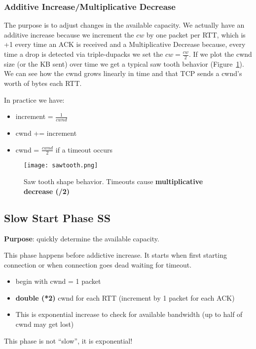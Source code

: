 \subsubsection{Additive Increase/Multiplicative Decrease}

The purpose is to adjust changes in the available capacity.
We actually have an additive increase because we increment the $cw$ by one
packet per RTT, which is +1 every time an ACK is received and a Multiplicative
Decrease because, every time a drop is detected via triple-dupacks we set the
$cw=\frac{cw}{2}$. If we plot the cwnd size (or the KB sent) over time we get a
typical saw tooth behavior (Figure~\ref{fig:tcp:sawtooth}). We can see how the
cwnd grows linearly in time and that TCP sends a cwnd's worth of bytes each RTT.

In practice we have:
\begin{itemize}
  \item increment = $\frac{1}{cwnd}$
  \item cwnd += increment
  \item cwnd = $\frac{cwnd}{2}$ if a timeout occurs
\end{itemize}

\begin{figure}[t]
\texttt{[image: sawtooth.png]}
\caption[Saw tooth shape behavior]{Saw tooth shape behavior. Timeouts cause
  \textbf{multiplicative decrease (/2)}}
\label{fig:tcp:sawtooth}
\end{figure}

\subsection{Slow Start Phase SS}

\textbf{Purpose}: quickly determine the available capacity.

\noindent This phase happens before addictive increase. It starts when first
starting connection or when connection goes dead waiting for timeout.

\begin{itemize}
\item begin with cwnd = 1 packet
\item \textbf{double (*2)} cwnd for each RTT (increment by 1 packet for each
  ACK)
\item This is exponential increase to check for available bandwidth (up to half
  of cwnd may get lost)
\end{itemize}

This phase is not ``slow'', it is exponential!

